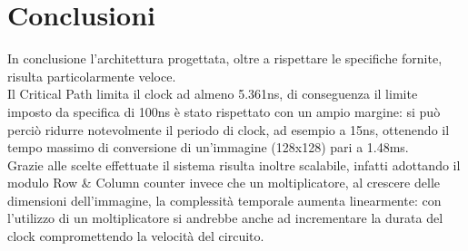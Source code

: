 \documentclass{article}
\begin{document}
\section{Conclusioni}
In conclusione l'architettura progettata, oltre a rispettare le specifiche fornite, risulta particolarmente veloce.\\
Il Critical Path limita il clock ad almeno 5.361ns, di conseguenza il limite imposto da specifica di 100ns è stato rispettato con un ampio margine:
si può perciò ridurre notevolmente il periodo di clock, ad esempio a 15ns, ottenendo il tempo massimo di conversione di un'immagine (128x128) pari a 1.48ms.\\
Grazie alle scelte effettuate il sistema risulta inoltre scalabile, infatti adottando il modulo Row \& Column counter invece che un moltiplicatore, al crescere delle dimensioni dell'immagine, la complessità temporale aumenta linearmente: con l'utilizzo di un moltiplicatore si andrebbe anche ad incrementare la durata del clock compromettendo la velocità del circuito.
\end{document}
